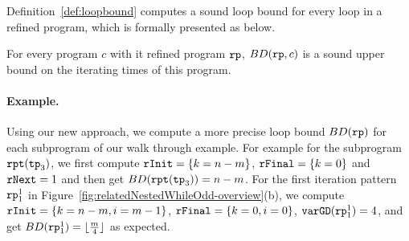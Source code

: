 \begin{defn}
\end{defn}
 Definition~\ref{def:loopbound} computes a sound loop bound for every loop in a refined program, which is formally presented as below.
\begin{lem}
  \label{lem:loopbound_sound}
  For every program $c$ with it refined program $\mathtt{rp}$,
  $BD(\mathtt{rp}, c)$ is a sound upper bound on the iterating times of this program.
\end{lem}

\paragraph{Example.}
Using our new approach, we compute a more precise loop bound $BD(\mathtt{rp})$ for each subprogram of our walk through example. 
For example for the subprogram $\mathtt{rpt}(\mathtt{tp}_3)$, we first compute $\mathtt{rInit} = \{k = n - m\}$, $\mathtt{rFinal} = \{k = 0\}$ and $\mathtt{rNext} = 1$ and then get $BD(\mathtt{rpt}(\mathtt{tp}_3)) = n - m$.
For the first iteration pattern $\mathtt{rp}_1^1$ in Figure~\ref{fig:relatedNestedWhileOdd-overview}(b), we compute 
$\mathtt{rInit} = \{k = n - m, i = m - 1\}$, $\mathtt{rFinal} = \{k = 0, i = 0\}$, $\mathtt{varGD}(\mathtt{rp}_1^1) = 4$, and get $BD(\mathtt{rp}_1^1) = \lfloor \frac{m}{4} \rfloor $ as expected.



